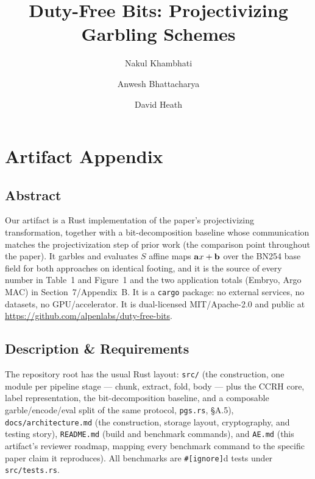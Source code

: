 \documentclass[nonacm,sigconf]{acmart}
\begin{document}
\title{Duty-Free Bits: Projectivizing Garbling Schemes}

\author{Nakul Khambhati}
\author{Anwesh Bhattacharya}
\author{David Heath}

\maketitle

\appendix

\section{Artifact Appendix}

\subsection{Abstract}

Our artifact is a Rust implementation of the paper's projectivizing
transformation, together with a bit-decomposition baseline whose
communication matches the projectivization step of prior work (the
comparison point throughout the paper). It garbles and evaluates $S$
affine maps $\vb{a}x+\vb{b}$ over the BN254 base field for both approaches
on identical footing, and it is the source of every number in Table~1 and
Figure~1 and the two application totals (Embryo, Argo MAC) in
Section~7/Appendix~B. It is a \texttt{cargo} package: no external services,
no datasets, no GPU/accelerator. It is dual-licensed MIT/Apache-2.0 and
public at \url{https://github.com/alpenlabs/duty-free-bits}.

\subsection{Description \& Requirements}

The repository root has the usual Rust layout: \texttt{src/} (the
construction, one module per pipeline stage — chunk, extract, fold, body —
plus the CCRH core, label representation, the bit-decomposition baseline,
and a composable garble/encode/eval split of the same protocol,
\texttt{pgs.rs}, \S A.5), \texttt{docs/architecture.md} (the construction, storage
layout, cryptography, and testing story), \texttt{README.md} (build and
benchmark commands), and \texttt{AE.md} (this artifact's reviewer roadmap,
mapping every benchmark command to the specific paper claim it reproduces).
All benchmarks are \texttt{\#[ignore]}d tests under \texttt{src/tests.rs}.
\end{document}
